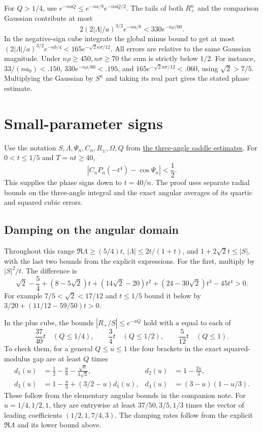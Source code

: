 \documentclass[11pt]{article}
\begin{document}
For $Q>1/4$, use $e^{-naQ}\le e^{-na/8}e^{-naQ/2}$. The tails of both $R_+^n$ and the comparison Gaussian contribute at most
\[
2(2|\Lambda|/a)^{3/2}e^{-na/8}<330e^{-n\rho/60}.
\]
In the negative-sign cube integrate the global minus bound to get at most $(2|\Lambda|/a)^{3/2}e^{-nb/4}<165e^{-\sqrt2n\sigma/12}$. All errors are relative to the same Gaussian magnitude. Under $n\rho\ge450,n\sigma\ge70$ the sum is strictly below $1/2$. For instance, $33/(n a_0)<.150$, $330e^{-n\rho/60}<.195$, and $165e^{-\sqrt2n\sigma/12}<.060$, using $\sqrt2>7/5$. Multiplying the Gaussian by $S^n$ and taking its real part gives the stated phase estimate.


\section{Small-parameter signs}
\label{sec:small}

Use the notation $S,\Lambda,\Psi_n,C_n,R_\pm,\Omega,Q$ from \hyperref[sec:central]{the three-angle saddle estimates}. For $0<t\le1/5$ and $T=nt\ge40$,
\[
\left|C_nP_n(-t^4)-\cos\Psi_n\right|<\frac12.
\]
This supplies the phase signs down to $t=40/n$. The proof uses separate radial bounds on the three-angle integral and the exact angular averages of its quartic and squared cubic errors.

\subsection{Damping on the angular domain}
\label{sec:damping-on-the-angular-domain}

Throughout this range $\Re\Lambda\ge(5/4)t$, $|\Lambda|\le 2t/(1+t)$, and $1+2\sqrt2t\le |S|$, with the last two bounds from the explicit expressions. For the first, multiply by $|S|^2/t$. The difference is
\[
\sqrt2-\frac54+(8-5\sqrt2)t+
(14\sqrt2-20)t^2+(24-30\sqrt2)t^3-45t^4>0.
\]
For example $7/5<\sqrt2<17/12$ and $t\le1/5$ bound it below by $3/20+(11/12-59/50)t>0$.

In the plus cube, the bounds $|R_+/S|\le e^{-a Q}$ hold with $a$ equal to each of
\[
\frac{37}{40}t\quad(Q\le1/4),\qquad
\frac34t\quad(Q\le1/2),\qquad
\frac5{12}t\quad(Q\le1).
\]
To check them, for a general $Q\le u\le1$ the four brackets in the exact squared-modulus gap are at least $Q$ times
\[
\begin{aligned}
d_1(u)&=\frac12-\frac{u}{8}-\frac{\sqrt u}{3\sqrt3},&
d_2(u)&=1-\frac{2u}{3},\\
d_3(u)&=1-\frac u3+(3/2-u)d_1(u),&
d_4(u)&=(3-u)(1-u/3).
\end{aligned}
\]
These follow from the elementary angular bounds in the companion note. For $u=1/4,1/2,1$, they are entrywise at least $37/50,3/5,1/3$ times the vector of leading coefficients $(1/2,1,7/4,3)$. The damping rates follow from the explicit $\Re\Lambda$ and its lower bound above.
\end{document}
